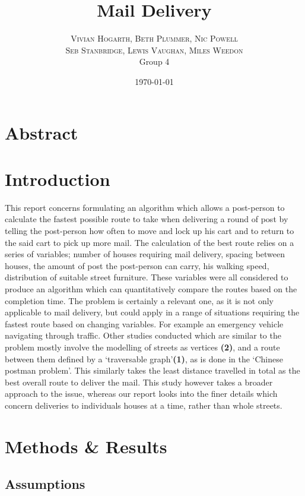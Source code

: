 \documentclass[14pt]{article}
\title{Mail Delivery}
\author{%
\textsc{Vivian Hogarth, Beth Plummer, Nic Powell} \\[1ex] 
\textsc{Seb Stanbridge, Lewis Vaughan, Miles Weedon} \\ [1ex]
\normalsize Group 4 \\ 
}
\date{\today}
\begin{document}
\maketitle

\section{Abstract}



\section{Introduction}
This report concerns formulating an algorithm which allows a post-person to calculate the fastest possible route to take when delivering a round of post by telling the post-person how often to move and lock up his cart and to return to the said cart to pick up more mail. The calculation of the best route relies on a series of variables; number of houses requiring mail delivery, spacing between houses, the amount of post the post-person can carry, his walking speed, distribution of suitable street furniture. These variables were all considered  to produce an algorithm which can quantitatively compare the routes based on the completion time. The problem is certainly a relevant one, as it is not only applicable to mail delivery, but could apply in a range of situations requiring the fastest route based on changing variables. For example an emergency vehicle navigating through traffic.
Other studies conducted which are similar to the problem mostly involve the modelling of streets as vertices \textbf{(2)}, and a route between them defined by a ‘traversable graph’\textbf{(1)}, as is done in the ‘Chinese postman problem’. This similarly takes the least distance travelled in total as the best overall route to deliver the mail. This study however takes a broader approach to the issue, whereas our report looks into the finer details which concern deliveries to individuals houses at a time, rather than whole streets.



\section{Methods \& Results}

\subsection{Assumptions}
\end{document}
